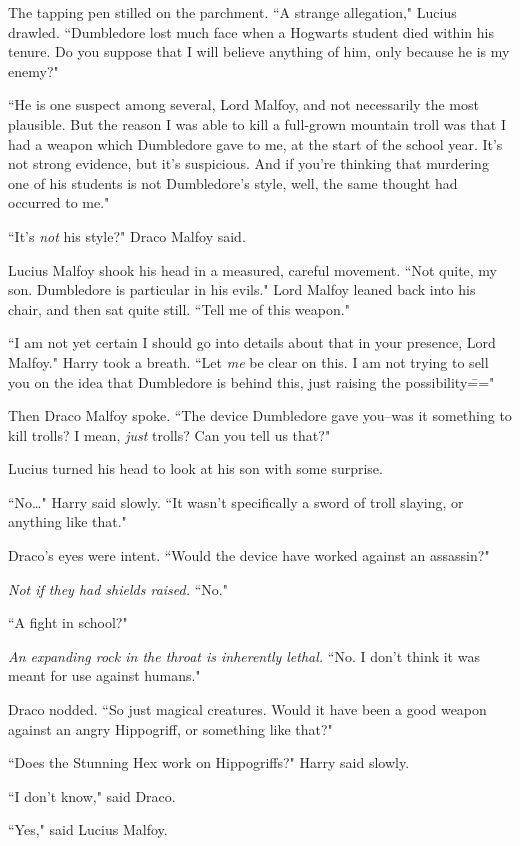 The tapping pen stilled on the parchment. ``A strange allegation," Lucius drawled. ``Dumbledore lost much face when a Hogwarts student died within his tenure. Do you suppose that I will believe anything of him, only because he is my enemy?"

``He is one suspect among several, Lord Malfoy, and not necessarily the most plausible. But the reason I was able to kill a full-grown mountain troll was that I had a weapon which Dumbledore gave to me, at the start of the school year. It's not strong evidence, but it's suspicious. And if you're thinking that murdering one of his students is not Dumbledore's style, well, the same thought had occurred to me."

``It's \emph{not} his style?" Draco Malfoy said.

Lucius Malfoy shook his head in a measured, careful movement. ``Not quite, my son. Dumbledore is particular in his evils." Lord Malfoy leaned back into his chair, and then sat quite still. ``Tell me of this weapon."

``I am not yet certain I should go into details about that in your presence, Lord Malfoy." Harry took a breath. ``Let \emph{me} be clear on this. I am not trying to sell you on the idea that Dumbledore is behind this, just raising the possibility\==="

Then Draco Malfoy spoke. ``The device Dumbledore gave you\---was it something to kill trolls? I mean, \emph{just} trolls? Can you tell us that?"

Lucius turned his head to look at his son with some surprise.

``No{\ldots}" Harry said slowly. ``It wasn't specifically a sword of troll slaying, or anything like that."

Draco's eyes were intent. ``Would the device have worked against an assassin?"

\emph{Not if they had shields raised.} ``No."

``A fight in school?"

\emph{An expanding rock in the throat is inherently lethal.} ``No. I don't think it was meant for use against humans."

Draco nodded. ``So just magical creatures. Would it have been a good weapon against an angry Hippogriff, or something like that?"

``Does the Stunning Hex work on Hippogriffs?" Harry said slowly.

``I don't know," said Draco.

``Yes," said Lucius Malfoy.

